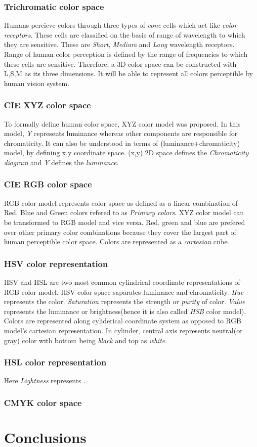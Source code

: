 \documentclass{article}
\begin{document}
\subsubsection{Trichromatic color space}
Humans percieve colors through three types of \textit{cone} cells which act like \textit{color receptors}. These cells are classified on the basis of range of wavelength to which they are sensitive. These are \textit{Short}, \textit{Medium} and \textit{Long} wavelength receptors. Range of human color perception is defined by the range of frequencies to which these cells are sensitive. Therefore, a 3D color space can be constructed with L,S,M as its three dimensions. It will be able to represent all colors perceptible by human vision system.

\subsubsection{CIE XYZ color space}
To formally define human color space, XYZ color model was proposed. In this model, \textit{Y} represents luminance whereas other components are responsible for chromaticity. It can also be understood in terms of (luminance+chromaticity) model, by defining x,y coordinate space. (x,y) 2D space defines the \textit{Chromaticity diagram} and \textit{Y} defines the \textit{luminance}. 

\subsubsection{CIE RGB color space}
RGB color model represents color space as defined as a linear combination of Red, Blue and Green colors refered to as \textit{Primary colors}. XYZ color model can be transformed to RGB model and vice versa. Red, green and blue are prefered over other primary color combinations because they cover the largest part of human perceptible color space. Colors are represented as a \textit{cartesian} cube.

\subsubsection{HSV color representation}
HSV and HSL are two most common cylindrical coordinate representations of RGB color model. HSV color space saparates luminance and chromaticity. \textit{Hue} represents the color. \textit{Saturation} represents the strength or \textit{purity} of color. \textit{Value} represents the luminance or brightness(hence it is also called \textit{HSB} color model). Colors are represented along cyliderical coordinate system as opposed to RGB model's cartesian representation. In cylinder, central axis represents neutral(or gray) color with bottom being \textit{black} and top as \textit{white}.

\subsubsection{HSL color representation}
Here \textit{Lightness} represents .

\subsubsection{CMYK color space}


\section{Conclusions}
\end{document}
